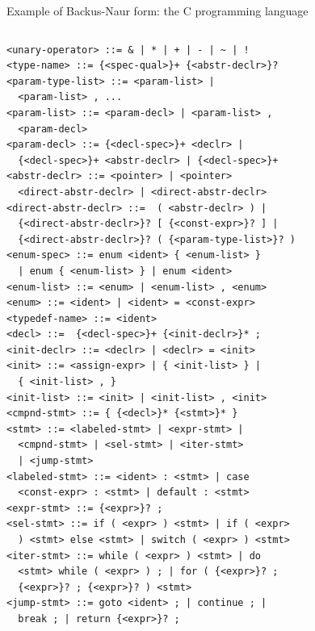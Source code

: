 \documentclass[aspectratio=169]{beamer}
\begin{document}
\begin{frame}[fragile]{Example of Backus-Naur form: the C programming language}
\begin{columns}[t]
\begin{verbatim}
<unary-operator> ::= & | * | + | - | ~ | !
<type-name> ::= {<spec-qual>}+ {<abstr-declr>}?
<param-type-list> ::= <param-list> |
  <param-list> , ...
<param-list> ::= <param-decl> | <param-list> ,
  <param-decl>
<param-decl> ::= {<decl-spec>}+ <declr> |
  {<decl-spec>}+ <abstr-declr> | {<decl-spec>}+
<abstr-declr> ::= <pointer> | <pointer>
  <direct-abstr-declr> | <direct-abstr-declr>
<direct-abstr-declr> ::=  ( <abstr-declr> ) |
  {<direct-abstr-declr>}? [ {<const-expr>}? ] |
  {<direct-abstr-declr>}? ( {<param-type-list>}? )
<enum-spec> ::= enum <ident> { <enum-list> }
  | enum { <enum-list> } | enum <ident>
<enum-list> ::= <enum> | <enum-list> , <enum>
<enum> ::= <ident> | <ident> = <const-expr>
<typedef-name> ::= <ident>
<decl> ::=  {<decl-spec>}+ {<init-declr>}* ;
<init-declr> ::= <declr> | <declr> = <init>
<init> ::= <assign-expr> | { <init-list> } |
  { <init-list> , }
<init-list> ::= <init> | <init-list> , <init>
<cmpnd-stmt> ::= { {<decl>}* {<stmt>}* }
<stmt> ::= <labeled-stmt> | <expr-stmt> |
  <cmpnd-stmt> | <sel-stmt> | <iter-stmt>
  | <jump-stmt>
<labeled-stmt> ::= <ident> : <stmt> | case
  <const-expr> : <stmt> | default : <stmt>
<expr-stmt> ::= {<expr>}? ;
<sel-stmt> ::= if ( <expr> ) <stmt> | if ( <expr>
  ) <stmt> else <stmt> | switch ( <expr> ) <stmt>
<iter-stmt> ::= while ( <expr> ) <stmt> | do
  <stmt> while ( <expr> ) ; | for ( {<expr>}? ;
  {<expr>}? ; {<expr>}? ) <stmt>
<jump-stmt> ::= goto <ident> ; | continue ; |
  break ; | return {<expr>}? ;
\end{verbatim}
\end{columns}
\end{frame}
\end{document}
